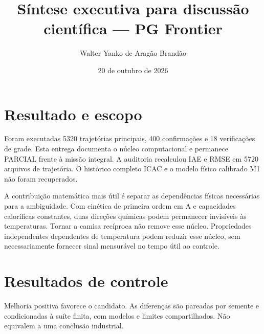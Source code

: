 \documentclass[
  11pt,
]{article}
\title{Síntese executiva para discussão científica --- PG Frontier}
\author{Walter Yanko de Aragão Brandão}
\date{20 de outubro de 2026}
\begin{document}
\maketitle

\hypertarget{resultado-e-escopo}{%
\section{Resultado e escopo}\label{resultado-e-escopo}}

Foram executadas 5320 trajetórias principais, 400 confirmações e 18
verificações de grade. Esta entrega documenta o núcleo computacional e
permanece PARCIAL frente à missão integral. A auditoria recalculou IAE e
RMSE em 5720 arquivos de trajetória. O histórico completo ICAC e o
modelo físico calibrado M1 não foram recuperados.

A contribuição matemática mais útil é separar as dependências físicas
necessárias para a ambiguidade. Com cinética de primeira ordem em A e
capacidades caloríficas constantes, duas direções químicas podem
permanecer invisíveis às temperaturas. Tornar a camisa recíproca não
remove esse núcleo. Propriedades independentes dependentes de
temperatura podem reduzir esse núcleo, sem necessariamente fornecer
sinal mensurável no tempo útil ao controle.

\newpage

\hypertarget{resultados-de-controle}{%
\section{Resultados de controle}\label{resultados-de-controle}}

Melhoria positiva favorece o candidato. As diferenças são pareadas por
semente e condicionadas à suíte finita, com modelos e limites
compartilhados. Não equivalem a uma conclusão industrial.

\begingroup\footnotesize
\end{document}
